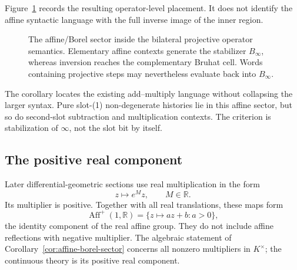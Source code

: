Figure~\ref{fig:affine-sector-inside-projective} records the resulting
operator-level placement.  It does not identify the affine syntactic language
with the full inverse image of the inner region.

\begin{figure}[t]
\centering
{}
\caption{The affine/Borel sector inside the bilateral projective operator
semantics.  Elementary affine contexts generate the stabilizer $B_\infty$,
whereas inversion reaches the complementary Bruhat cell.  Words containing
projective steps may nevertheless evaluate back into $B_\infty$.}
\label{fig:affine-sector-inside-projective}
\end{figure}

The corollary locates the existing add--multiply language without collapsing
the larger syntax.  Pure slot-(1) non-degenerate histories lie in this affine
sector, but so do second-slot subtraction and multiplication contexts.  The
criterion is stabilization of $\infty$, not the slot bit by itself.

\subsection{The positive real component}

Later differential-geometric sections use real multiplication in the form
\[
  z\longmapsto e^M z,
  \qquad M\in\mathbb R.
\]
Its multiplier is positive.  Together with all real translations, these maps
form
\[
  \operatorname{Aff}^+(1,\mathbb R)
  =\{z\mapsto az+b:a>0\},
\]
the identity component of the real affine group.  They do not include affine
reflections with negative multiplier.  The algebraic statement of
Corollary~\ref{cor:affine-borel-sector} concerns all nonzero multipliers in
$K^\times$; the continuous theory is its positive real component.

